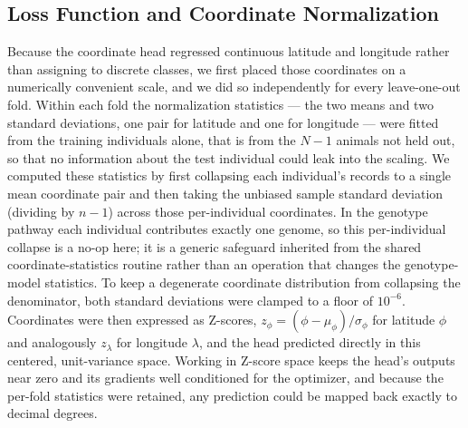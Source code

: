 \documentclass[twocolumn,10pt]{article}
\begin{document}
\subsection{Loss Function and Coordinate Normalization}
Because the coordinate head regressed continuous latitude and longitude rather than assigning to
discrete classes, we first placed those coordinates on a numerically convenient scale, and we did so
independently for every leave-one-out fold. Within each fold the normalization statistics --- the
two means and two standard deviations, one pair for latitude and one for longitude --- were fitted
from the training individuals alone, that is from the $N-1$ animals not held out, so that no
information about the test individual could leak into the scaling. We computed these statistics by
first collapsing each individual's records to a single mean coordinate pair and then taking the
unbiased sample standard deviation (dividing by $n-1$) across those per-individual coordinates. In
the genotype pathway each individual contributes exactly one genome, so this per-individual collapse
is a no-op here; it is a generic safeguard inherited from the shared coordinate-statistics routine
rather than an operation that changes the genotype-model statistics. To keep a degenerate coordinate
distribution from collapsing the denominator, both standard deviations were clamped to a floor of
$10^{-6}$. Coordinates were then expressed as Z-scores, $z_{\phi} = (\phi -
\mu_{\phi})/\sigma_{\phi}$ for latitude $\phi$ and analogously $z_{\lambda}$ for longitude
$\lambda$, and the head predicted directly in this centered, unit-variance space. Working in Z-score
space keeps the head's outputs near zero and its gradients well conditioned for the optimizer, and
because the per-fold statistics were retained, any prediction could be mapped back exactly to
decimal degrees.
\end{document}
